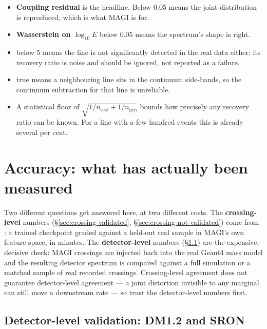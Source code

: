 \documentclass[11pt,a4paper]{article}
\begin{document}
\begin{itemize}[nosep]
  \item \textbf{Coupling residual} is the headline. Below 0.05 means the joint
    distribution is reproduced, which is what MAGI is for.
  \item \textbf{Wasserstein on $\log_{10}E$} below 0.05 means the spectrum's
    shape is right.
  \item \textbf{} below 5 means the line is not
    significantly detected in the real data either; its recovery ratio is
    noise and should be ignored, not reported as a failure.
  \item \textbf{} true means a neighbouring line
    sits in the continuum side-bands, so the continuum subtraction for that
    line is unreliable.
  \item A statistical floor of
    $\sqrt{1/n_{\text{real}} + 1/n_{\text{gen}}}$ bounds how precisely any
    recovery ratio can be known. For a line with a few hundred events this is
    already several per cent.
\end{itemize}

\section{Accuracy: what has actually been measured}
\label{sec:envelope}

Two different questions get answered here, at two different costs. The
\textbf{crossing-level} numbers (\S\ref{sec:crossing-validated},
\S\ref{sec:crossing-not-validated}) come from :
a trained checkpoint graded against a held-out real sample in MAGI's own
feature space, in minutes. The \textbf{detector-level} numbers
(\S\ref{sec:detector-validation}) are the expensive, decisive check: MAGI
crossings are injected back into the real Geant4 mass model and the resulting
detector spectrum is compared against a full simulation or a matched sample of
real recorded crossings. Crossing-level agreement does not guarantee
detector-level agreement --- a joint distortion invisible to any marginal can
still move a downstream rate --- so trust the detector-level numbers first.

\subsection{Detector-level validation: DM1.2 and SRON}
\label{sec:detector-validation}
\end{document}
